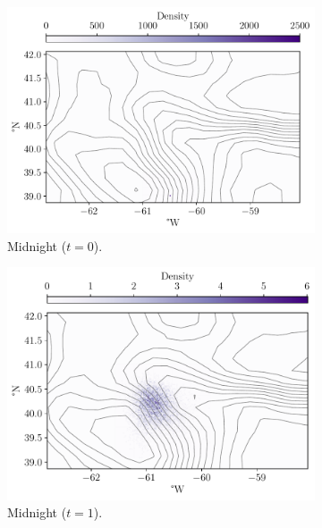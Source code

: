 \begin{figure}
	\centering
	\begin{subfigure}{0.49\textwidth}
		\includegraphics[width=\textwidth]{chp06_applications/figures/gulf_stream/rels_ssh_0.0}
		\caption{Midnight  (\(t = 0\)).}
		\label{fig:na_hist_t3_0}
	\end{subfigure}
	\begin{subfigure}{0.49\textwidth}
		\includegraphics[width=\textwidth]{chp06_applications/figures/gulf_stream/rels_ssh_1.0}
		\caption{Midnight  (\(t = 1\)).}
		\label{fig:na_hist_t3_1}
	\end{subfigure}
	\begin{subfigure}{0.49\textwidth}

\end{subfigure}
\end{figure}
